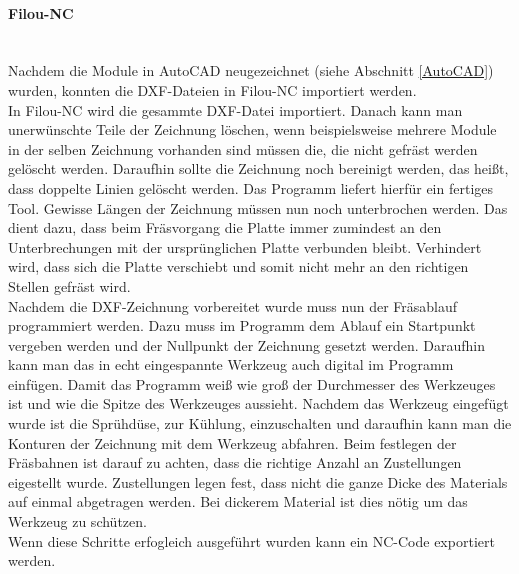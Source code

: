     \paragraph{Filou-NC}\mbox{}\\
    Nachdem die Module in AutoCAD neugezeichnet (siehe Abschnitt \ref{AutoCAD}) wurden, konnten die DXF-Dateien in Filou-NC importiert werden.\\
    In Filou-NC wird die gesammte DXF-Datei importiert. Danach kann man unerwünschte Teile der Zeichnung löschen, wenn beispielsweise mehrere Module in der selben Zeichnung vorhanden sind müssen die, die nicht gefräst werden gelöscht werden. Daraufhin sollte die Zeichnung noch bereinigt werden, das heißt, dass doppelte Linien gelöscht werden. Das Programm liefert hierfür ein fertiges Tool. Gewisse Längen der Zeichnung müssen nun noch unterbrochen werden. Das dient dazu, dass beim Fräsvorgang die Platte immer zumindest an den Unterbrechungen mit der ursprünglichen Platte verbunden bleibt. Verhindert wird, dass sich die Platte verschiebt und somit nicht mehr an den richtigen Stellen gefräst wird.\\
    Nachdem die DXF-Zeichnung vorbereitet wurde muss nun der Fräsablauf programmiert werden. Dazu muss im Programm dem Ablauf ein Startpunkt vergeben werden und der Nullpunkt der Zeichnung gesetzt werden. Daraufhin kann man das in echt eingespannte Werkzeug auch digital im Programm einfügen. Damit das Programm weiß wie groß der Durchmesser des Werkzeuges ist und wie die Spitze des Werkzeuges aussieht. Nachdem das Werkzeug eingefügt wurde ist die Sprühdüse, zur Kühlung, einzuschalten und daraufhin kann man die Konturen der Zeichnung mit dem Werkzeug abfahren. Beim festlegen der Fräsbahnen ist darauf zu achten, dass die richtige Anzahl an Zustellungen eigestellt wurde. Zustellungen legen fest, dass nicht die ganze Dicke des Materials auf einmal abgetragen werden. Bei dickerem Material ist dies nötig um das Werkzeug zu schützen.\\
    Wenn diese Schritte erfogleich ausgeführt wurden kann ein NC-Code exportiert werden. 
